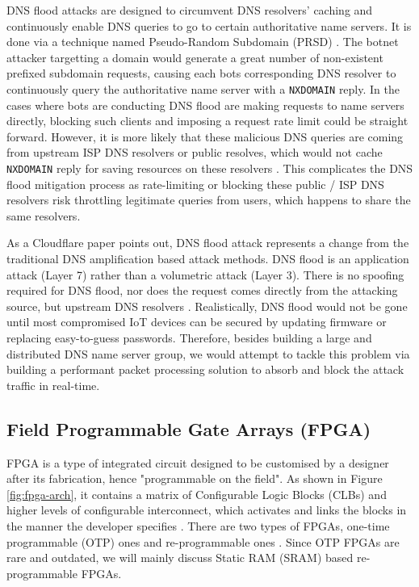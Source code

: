 \documentclass[a4paper]{report}
\newcommand{\code}{\texttt}
\begin{document}
DNS flood attacks are designed to circumvent DNS resolvers' caching and continuously enable DNS queries to go to certain authoritative name servers. It is done via a technique named Pseudo-Random Subdomain (PRSD) \cite{akamai-dns-flood}. The botnet attacker targetting a domain would generate a great number of non-existent prefixed subdomain requests, causing each bots corresponding DNS resolver to continuously query the authoritative name server with a \code{NXDOMAIN} reply. In the cases where bots are conducting DNS flood are making requests to name servers directly, blocking such clients and imposing a request rate limit could be straight forward. However, it is more likely that these malicious DNS queries are coming from upstream ISP DNS resolvers or public resolves, which would not cache \code{NXDOMAIN} reply for saving resources on these resolvers \cite{akamai-dns-flood}. This complicates the DNS flood mitigation process as rate-limiting or blocking these public / ISP DNS resolvers risk throttling legitimate queries from users, which happens to share the same resolvers.

As a Cloudflare paper \cite{cloudflare-dns-flood} points out, DNS flood attack represents a change from the traditional DNS amplification based attack methods. DNS flood is an application attack (Layer 7) rather than a volumetric attack (Layer 3). There is no spoofing required for DNS flood, nor does the request comes directly from the attacking source, but upstream DNS resolvers \cite{akamai-dns-flood, cloudflare-dns-flood}. Realistically, DNS flood would not be gone until most compromised IoT devices can be secured by updating firmware or replacing easy-to-guess passwords. Therefore, besides building a large and distributed DNS name server group, we would attempt to tackle this problem via building a performant packet processing solution to absorb and block the attack traffic in real-time.

\subsection{Field Programmable Gate Arrays (FPGA)}
\label{section:background-fpga}

FPGA is a type of integrated circuit designed to be customised by a designer after its fabrication, hence "programmable on the field". As shown in Figure \ref{fig:fpga-arch}, it contains a matrix of Configurable Logic Blocks (CLBs) and higher levels of configurable interconnect, which activates and links the blocks in the manner the developer specifies \cite{xilinx-fpga}. There are two types of FPGAs, one-time programmable (OTP) ones and re-programmable ones \cite{xilinx-fpga}. Since OTP FPGAs are rare and outdated, we will mainly discuss Static RAM (SRAM) based re-programmable FPGAs.
\end{document}
